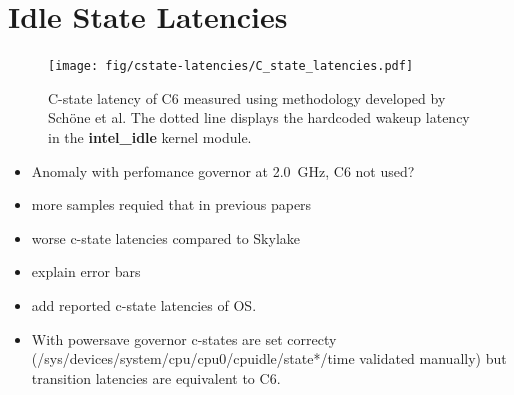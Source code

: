 \section{Idle State Latencies}

\begin{figure}[!ht]
    \centering
    \texttt{[image: fig/cstate-latencies/C\_state\_latencies.pdf]}
    \caption{\label{fig:c6_latencies}C-state latency of C6 measured using methodology developed by Schöne et al.
The dotted line displays the hardcoded wakeup latency in the \protect\textbf{intel\_idle} kernel module.
\protect\footnotemark}
\end{figure}

\begin{itemize}
    \item Anomaly with perfomance governor at \SI{2.0}{\GHz}, C6 not used?
    \item more samples requied that in previous papers
    \item worse c-state latencies compared to Skylake
    \item explain error bars
    \item add reported c-state latencies of OS.
    \item With powersave governor c-states are set correcty (/sys/devices/system/cpu/cpu0/cpuidle/state*/time validated manually) but transition latencies are equivalent to C6.
\end{itemize}

